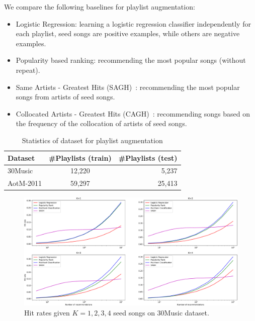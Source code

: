 We compare the following baselines for playlist augmentation:
\begin{itemize}
\item Logistic Regression: learning a logistic regression classifier independently for each playlist,
      seed songs are positive examples, while others are negative examples.
\item Popularity based ranking: recommending the most popular songs (without repeat).
\item Same Artists - Greatest Hits (SAGH)~\cite{mcfee2012million}: 
      recommending the most popular songs from artists of seed songs.
\item Collocated Artists - Greatest Hits (CAGH)~\cite{bonnin2013evaluating}: 
      recommending songs based on the frequency of the collocation of artists of seed songs.
\end{itemize}

\begin{table}[!h]
\centering
\caption{Statistics of dataset for playlist augmentation}
\label{tab:stats_pla}
\small
\begin{tabular}{l|cr}
\toprule
Dataset   & \#Playlists (train) & \#Playlists (test) \\
\midrule
30Music   & 12,220              & 5,237 \\
AotM-2011 & 59,297              & 25,413 \\       
\bottomrule
\end{tabular}
\end{table}



\begin{figure}[!h]
\centering
\includegraphics[width=\linewidth]{fig/30music-2.pdf}
\caption{Hit rates given $K=1,2,3,4$ seed songs on 30Music dataset.}
\end{figure}


